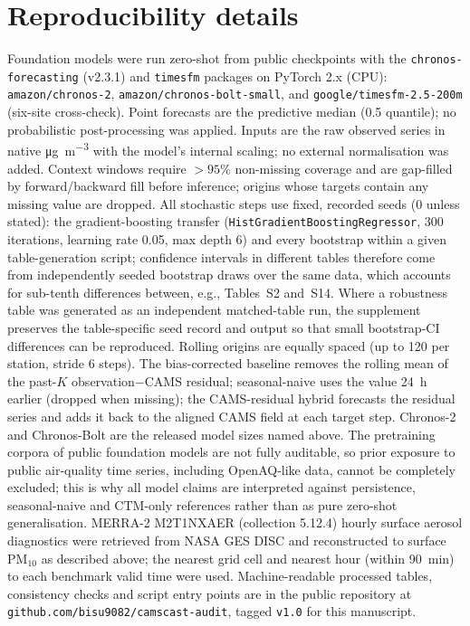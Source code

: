 \documentclass[11pt]{article}
\newcommand*{\pmten}{\ensuremath{\mathrm{PM_{10}}}}
\begin{document}
\section{Reproducibility details}
Foundation models were run zero-shot from public checkpoints with the \texttt{chronos-forecasting} (v2.3.1) and \texttt{timesfm} packages on PyTorch 2.x (CPU): \texttt{amazon/chronos-2}, \texttt{amazon/chronos-bolt-small}, and \texttt{google/timesfm-2.5-200m} (six-site cross-check). Point forecasts are the predictive median (0.5 quantile); no probabilistic post-processing was applied. Inputs are the raw observed series in native \si{\micro\gram\per\cubic\metre} with the model's internal scaling; no external normalisation was added. Context windows require $>95\%$ non-missing coverage and are gap-filled by forward/backward fill before inference; origins whose targets contain any missing value are dropped. All stochastic steps use fixed, recorded seeds (0 unless stated): the gradient-boosting transfer (\texttt{HistGradientBoostingRegressor}, 300 iterations, learning rate 0.05, max depth 6) and every bootstrap within a given table-generation script; confidence intervals in different tables therefore come from independently seeded bootstrap draws over the same data, which accounts for sub-tenth differences between, e.g., Tables~S2 and~S14. Where a robustness table was generated as an independent matched-table run, the supplement preserves the table-specific seed record and output so that small bootstrap-CI differences can be reproduced. Rolling origins are equally spaced (up to 120 per station, stride 6 steps). The bias-corrected baseline removes the rolling mean of the past-$K$ observation$-$CAMS residual; seasonal-naive uses the value 24~h earlier (dropped when missing); the CAMS-residual hybrid forecasts the residual series and adds it back to the aligned CAMS field at each target step. Chronos-2 and Chronos-Bolt are the released model sizes named above. The pretraining corpora of public foundation models are not fully auditable, so prior exposure to public air-quality time series, including OpenAQ-like data, cannot be completely excluded; this is why all model claims are interpreted against persistence, seasonal-naive and CTM-only references rather than as pure zero-shot generalisation. MERRA-2 M2T1NXAER (collection 5.12.4) hourly surface aerosol diagnostics were retrieved from NASA GES DISC and reconstructed to surface \pmten{} as described above; the nearest grid cell and nearest hour (within 90~min) to each benchmark valid time were used. Machine-readable processed tables, consistency checks and script entry points are in the public repository at \texttt{github.com/bisu9082/camscast-audit}, tagged \texttt{v1.0} for this manuscript.
\end{document}
